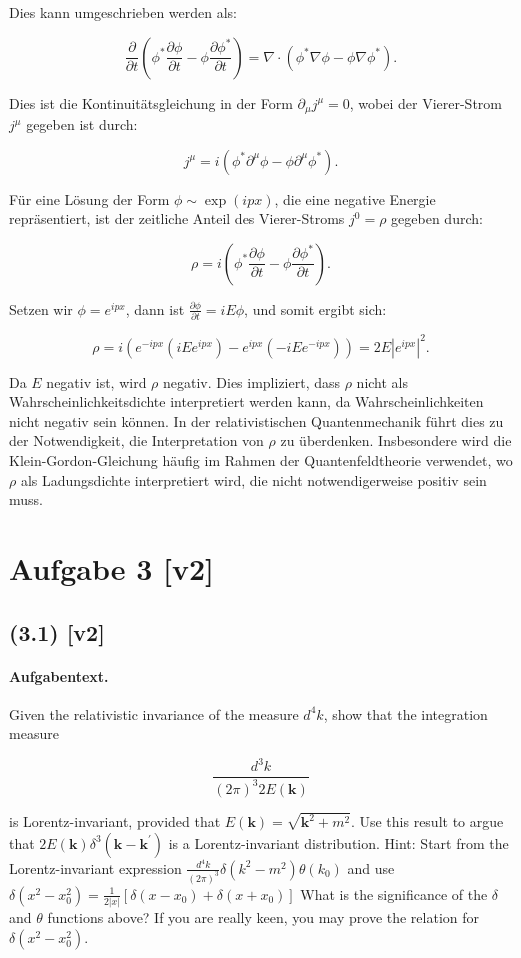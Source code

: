 \documentclass[11pt,a4paper]{article}
\begin{document}
Dies kann umgeschrieben werden als:

\[
\frac{\partial}{\partial t} \left(\phi^* \frac{\partial \phi}{\partial t} - \phi \frac{\partial \phi^*}{\partial t}\right) = \nabla \cdot \left(\phi^* \nabla \phi - \phi \nabla \phi^*\right).
\]

Dies ist die Kontinuitätsgleichung in der Form \(\partial_\mu j^\mu = 0\), wobei der Vierer-Strom \(j^\mu\) gegeben ist durch:

\[
j^\mu = i\left(\phi^* \partial^\mu \phi - \phi \partial^\mu \phi^*\right).
\]

Für eine Lösung der Form \(\phi \sim \exp(i p x)\), die eine negative Energie repräsentiert, ist der zeitliche Anteil des Vierer-Stroms \(j^0 = \rho\) gegeben durch:

\[
\rho = i\left(\phi^* \frac{\partial \phi}{\partial t} - \phi \frac{\partial \phi^*}{\partial t}\right).
\]

Setzen wir \(\phi = e^{i p x}\), dann ist \(\frac{\partial \phi}{\partial t} = i E \phi\), und somit ergibt sich:

\[
\rho = i\left(e^{-i p x} (i E e^{i p x}) - e^{i p x} (-i E e^{-i p x})\right) = 2 E |e^{i p x}|^2.
\]

Da \(E\) negativ ist, wird \(\rho\) negativ. Dies impliziert, dass \(\rho\) nicht als Wahrscheinlichkeitsdichte interpretiert werden kann, da Wahrscheinlichkeiten nicht negativ sein können. In der relativistischen Quantenmechanik führt dies zu der Notwendigkeit, die Interpretation von \(\rho\) zu überdenken. Insbesondere wird die Klein-Gordon-Gleichung häufig im Rahmen der Quantenfeldtheorie verwendet, wo \(\rho\) als Ladungsdichte interpretiert wird, die nicht notwendigerweise positiv sein muss.

\section*{Aufgabe 3 [v2]}
\subsection*{(3.1) [v2]}
\paragraph{Aufgabentext.}
Given the relativistic invariance of the measure $d^4 k$, show that the integration measure

$$
\frac{d^3 k}{(2 \pi)^3 2 E(\mathbf{k})}
$$

is Lorentz-invariant, provided that $E(\mathbf{k})=\sqrt{\mathbf{k}^2+m^2}$. Use this result to argue that $2 E(\mathbf{k}) \delta^3\left(\mathbf{k}-\mathbf{k}^{\prime}\right)$ is a Lorentz-invariant distribution.
Hint: Start from the Lorentz-invariant expression $\frac{d^4 k}{(2 \pi)^3} \delta\left(k^2-m^2\right) \theta\left(k_0\right)$ and use $\delta\left(x^2-x_0^2\right)=\frac{1}{2|x|}\left[\delta\left(x-x_0\right)+\delta\left(x+x_0\right)\right]$ What is the significance of the $\delta$ and $\theta$ functions above? If you are really keen, you may prove the relation for $\delta\left(x^2-x_0^2\right)$.
\end{document}
